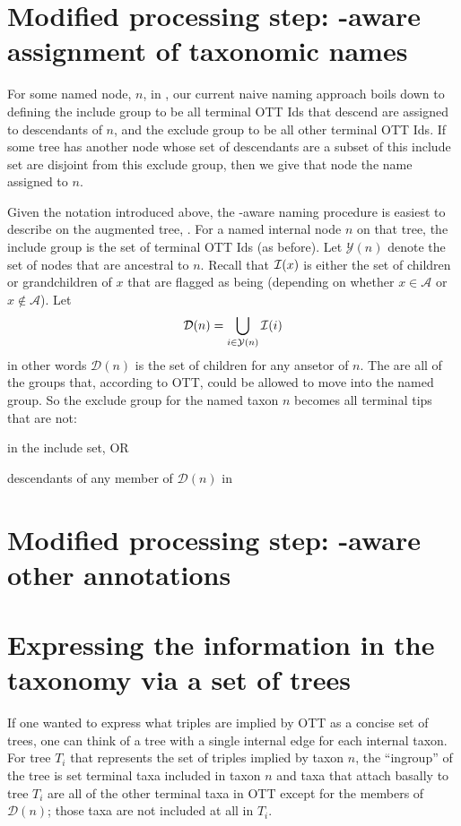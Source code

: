 \documentclass[11pt]{article}
\begin{document}
\section{Modified processing step: \insed-aware assignment of taxonomic names}
For some named node, $n$, in \naiveFullTree, our current naive naming approach
    boils down to defining the include group to be all terminal OTT Ids that descend are assigned to descendants of $n$, and 
    the exclude group to be all other terminal OTT Ids.
If some tree has another node whose set of descendants are a subset of this include
    set are disjoint from this exclude group, then we give that node the name assigned to $n$.

Given the notation introduced above, the \insed-aware naming procedure is easiest to describe on the augmented tree, \augmentedFullTree.
For a named internal node $n$ on that tree, the include group is the set of terminal 
    OTT Ids (as before).
Let $\mathcal{Y}(n)$ denote the set of nodes that are ancestral to $n$.
Recall that $\mathcal{I}(x)$ is either the set of children or grandchildren of $x$ that 
    are flagged as being \insed (depending on whether $x\in\mathcal{A}$ or $x\notin\mathcal{A}$).
Let $$\mathcal{D}(n) =\bigcup_{i\in\mathcal{Y}(n)}\mathcal{I}(i)$$
in other words $\mathcal{D}(n)$ is the set of \insed children for any ansetor of $n$.
The are all of the \insed groups that, according to OTT, could be allowed to move into the named
    group.
So the exclude group for the named taxon $n$ becomes all terminal tips that are not:
\begin{compactitem}
    \item in the include set, OR
    \item descendants of any member of $\mathcal{D}(n)$ in \augmentedFullTree
\end{compactitem}
\section{Modified processing step: \insed-aware other annotations}

\section{Expressing the information in the taxonomy via a set of trees}
If one wanted to express what triples are implied by OTT as a concise set of
    trees, one can think of a tree with a single internal edge for each internal taxon.
For tree $T_i$ that represents the set of triples implied by taxon $n$, the
    ``ingroup'' of the tree is set terminal taxa included in taxon $n$ and taxa
    that attach basally to tree $T_i$ are all of the other terminal taxa in OTT
    except for the members of $\mathcal{D}(n)$;
    those \insed taxa are not included at all in $T_i$.

\end{document}
